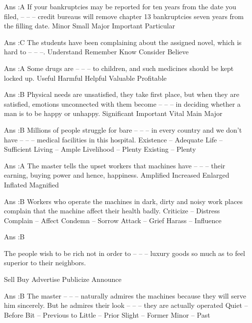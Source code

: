    Ans :A
    If your bankruptcies may be reported for ten years from the date you filed, -- -- -- credit bureaus will remove chapter 13 bankruptcies seven years from the filling date.
        Minor
        Small
        Major
        Important
        Particular 

    Ans :C
    The students have been complaining about the assigned novel, which is hard to -- -- --.
        Understand
        Remember
        Know
        Consider
        Believe 

    Ans :A
    Some drugs are -- -- -- to children, and such medicines should be kept locked up.
        Useful
        Harmful
        Helpful
        Valuable
        Profitable 

    Ans :B
    Physical needs are unsatisfied, they take first place, but when they are satisfied, emotions unconnected with them become -- -- -- in deciding whether a man is to be happy or unhappy.
        Significant
        Important
        Vital
        Main
        Major 

    Ans :B
    Millions of people struggle for bare -- -- -- in every country and we don’t have -- -- -- medical facilities in this hospital.
        Existence – Adequate
        Life – Sufficient
        Living – Ample
        Livelihood – Plenty
        Existing – Plenty 

    Ans :A
    The master tells the upset workers that machines have -- -- -- their earning, buying power and hence, happiness.
        Amplified
        Increased
        Enlarged
        Inflated
        Magnified 

    Ans :B
    Workers who operate the machines in dark, dirty and noisy work places complain that the machine affect their health badly.
        Criticize – Distress
        Complain – Affect
        Condemn – Sorrow
        Attack – Grief
        Harass – Influence 

    Ans :B 



    The people wish to be rich not in order to -- -- -- luxury goods so much as to feel superior to their neighbors.

        Sell
        Buy
        Advertise
        Publicize
        Announce 

    Ans :B
    The master -- -- -- naturally admires the machines because they will serve him sincerely. But he admires their look -- -- -- they are actually operated
        Quiet – Before
        Bit – Previous to
        Little – Prior
        Slight – Former
        Minor – Past 

